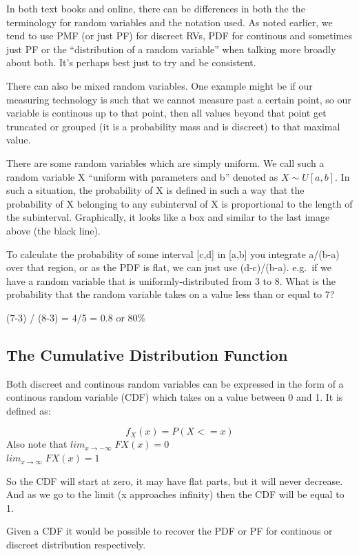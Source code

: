 \documentclass[]{book}
\theoremstyle{definition}
\theoremstyle{definition}
\theoremstyle{definition}
\theoremstyle{remark}
\begin{document}
In both text books and online, there can be differences in both the the
terminology for random variables and the notation used. As noted
earlier, we tend to use PMF (or just PF) for discreet RVs, PDF for
continous and sometimes just PF or the ``distribution of a random
variable'' when talking more broadly about both. It's perhaps best just
to try and be consistent.

There can also be mixed random variables. One example might be if our
measuring technology is such that we cannot measure past a certain
point, so our variable is continous up to that point, then all values
beyond that point get truncated or grouped (it is a probability mass and
is discreet) to that maximal value.

There are some random variables which are simply uniform. We call such a
random variable X ``uniform with parameters and b'' denoted as
\(X \sim U[a,b]\). In such a situation, the probability of X is defined
in such a way that the probability of X belonging to any subinterval of
X is proportional to the length of the subinterval. Graphically, it
looks like a box and similar to the last image above (the black line).

To calculate the probability of some interval {[}c,d{]} in {[}a,b{]} you
integrate a/(b-a) over that region, or as the PDF is flat, we can just
use (d-c)/(b-a). e.g.~if we have a random variable that is
uniformly-distributed from 3 to 8. What is the probability that the
random variable takes on a value less than or equal to 7?

(7-3) / (8-3) = 4/5 = 0.8 or 80\%

\subsection{The Cumulative Distribution
Function}\label{the-cumulative-distribution-function}

Both discreet and continous random variables can be expressed in the
form of a continous random variable (CDF) which takes on a value between
0 and 1. It is defined as:

\[f_X(x) = P(X <= x)\] Also note that \(lim_{x→-∞}\; FX(x) = 0\)\\
\(lim_{x→∞}\; FX(x) = 1\)

So the CDF will start at zero, it may have flat parts, but it will never
decrease. And as we go to the limit (x approaches infinity) then the CDF
will be equal to 1.

Given a CDF it would be possible to recover the PDF or PF for continous
or discreet distribution respectively.
\end{document}
